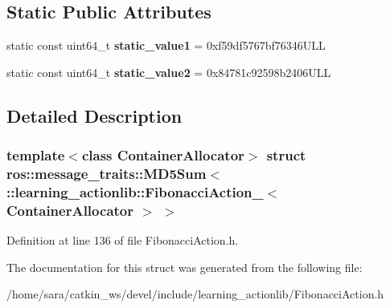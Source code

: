 \subsection*{Static Public Attributes}
\begin{DoxyCompactItemize}
\item 
\mbox{\label{structros_1_1message__traits_1_1MD5Sum_3_01_1_1learning__actionlib_1_1FibonacciAction___3_01ContainerAllocator_01_4_01_4_a60a70b104f9985c8f6e26cb3d1b8da36}} 
static const uint64\+\_\+t {\bfseries static\+\_\+value1} = 0xf59df5767bf76346\+U\+LL
\item 
\mbox{\label{structros_1_1message__traits_1_1MD5Sum_3_01_1_1learning__actionlib_1_1FibonacciAction___3_01ContainerAllocator_01_4_01_4_a85c5893e9d2c4f55b43c93dbbacd1c0d}} 
static const uint64\+\_\+t {\bfseries static\+\_\+value2} = 0x84781c92598b2406\+U\+LL
\end{DoxyCompactItemize}


\subsection{Detailed Description}
\subsubsection*{template$<$class Container\+Allocator$>$\newline
struct ros\+::message\+\_\+traits\+::\+M\+D5\+Sum$<$ \+::learning\+\_\+actionlib\+::\+Fibonacci\+Action\+\_\+$<$ Container\+Allocator $>$ $>$}



Definition at line 136 of file Fibonacci\+Action.\+h.



The documentation for this struct was generated from the following file\+:\begin{DoxyCompactItemize}
\item 
/home/sara/catkin\+\_\+ws/devel/include/learning\+\_\+actionlib/Fibonacci\+Action.\+h\end{DoxyCompactItemize}
